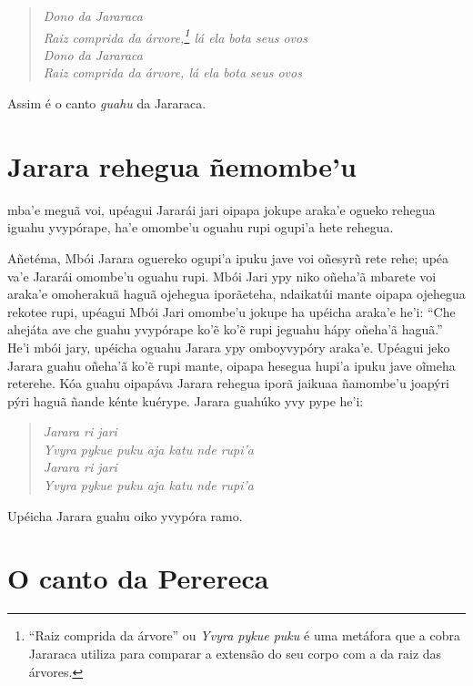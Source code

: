 \begin{verse}
\itshape
Dono da Jararaca\\
Raiz comprida da árvore,\footnote{``Raiz comprida da árvore'' ou \emph{Yvyra pykue puku} é uma metáfora que a cobra Jararaca utiliza para comparar a extensão do seu corpo com a da raiz das árvores.} lá ela bota seus ovos\\
Dono da Jararaca\\
Raiz comprida da árvore, lá ela bota seus ovos
\end{verse}

Assim é o canto \emph{guahu} da Jararaca.

\chapter{Jarara rehegua ñemombe’u}

 mba'e meguã voi, upéagui Jararái jari oipapa jokupe araka'e ogueko
rehegua iguahu yvypórape, ha'e omombe'u oguahu rupi ogupi'a hete
rehegua.


Añetéma, Mbói Jarara oguereko ogupi'a ipuku jave voi oñesyrũ rete rehe;
upéa va'e Jararái omombe'u oguahu rupi. Mbói Jari ypy niko oñeha'ã
mbarete voi araka'e omoherakuã haguã ojehegua iporãeteha, ndaikatúi
mante oipapa ojehegua rekotee rupi, upéagui Mbói Jari omombe'u jokupe ha
upéicha araka'e he'i: ``Che ahejáta ave che guahu yvypórape ko'ẽ ko'ẽ
rupi jeguahu hápy oñeha'ã haguã.'' He'i mbói jary, upéicha oguahu Jarara
ypy omboyvypóry araka'e. Upéagui jeko Jarara guahu oñeha'ã ko'ẽ rupi
mante, oipapa hesegua hupi'a ipuku jave oĩmeha reterehe. Kóa guahu
oipapáva Jarara rehegua iporã jaikuaa ñamombe'u joapýri pýri haguã ñande
kénte kuérype. Jarara guahúko yvy pype he'i:

\begin{verse}
\itshape
Jarara ri jari\\
Yvyra pykue puku aja katu nde rupi'a\\
Jarara ri jari\\
Yvyra pykue puku aja katu nde rupi'a
\end{verse}


Upéicha Jarara guahu oiko yvypóra ramo.


\chapter{O canto da Perereca}

